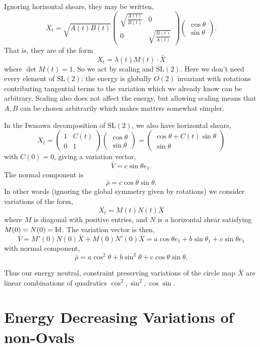 \documentclass[12pt]{article}
\begin{document}
Ignoring horizontal shears, they may be written,
\[
X_t = \sqrt{A(t) B(t)}
\begin{pmatrix}
\sqrt{\frac{A(t)}{B(t)}} & 0 \\
0 & \sqrt{\frac{B(t)}{A(t)}}
\end{pmatrix}
\begin{pmatrix}
\cos \theta \\
\sin \theta
\end{pmatrix}.
\]
That is, they are of the form
\[
X_t = \lambda(t) M(t) \cdot \bar{X}
\]
where \(\det M(t) = 1\). So we act by scaling and \(\text{SL}(2)\). Here we don't need every element of \(\text{SL}(2)\): the energy is globally \(O(2)\) invariant with rotations contributing tangential terms to the variation which we already know can be arbitrary. Scaling also does not affect the energy, but allowing scaling means that \(A, B\) can be chosen arbitrarily which makes matters somewhat simpler.

In the Iwasawa decomposition of \(\text{SL}(2)\), we also have horizontal shears,
\[
X_t = 
\begin{pmatrix}
1 & C(t) \\
0 & 1
\end{pmatrix}
\begin{pmatrix}
\cos \theta \\
\sin \theta
\end{pmatrix}
=
\begin{pmatrix}
\cos\theta + C(t) \sin\theta \\
\sin\theta
\end{pmatrix}
\]
with \(C(0) = 0\), giving a variation vector,
\[
\bar{V} = c \sin\theta e_1.
\]
The normal component is
\[
\bar{\rho} = c \cos\theta \sin\theta.
\]
In other words (ignoring the global symmetry given by rotations) we consider variations of the form,
\[
X_t = M(t) N(t) \bar{X}
\]
where \(M\) is diagonal with positive entries, and \(N\) is a horizontal shear satisfying \(M(0) = N(0) = \operatorname{Id}\). The variation vector is then,
\[
\bar{V} = M'(0) N(0) \bar{X} + M(0) N'(0) \bar{X} = a \cos\theta e_1 + b \sin\theta_1 + c \sin\theta e_1
\]
with normal component,
\[
\bar{\rho} = a \cos^2\theta + b \sin^2 \theta + c \cos\theta \sin\theta.
\]

Thus our energy neutral, constraint preserving variations of the circle map \(\bar{X}\) are linear combinations of quadratics \(\cos^2, \sin^2, \cos \sin\).

\section{Energy Decreasing Variations of non-Ovals}
\end{document}
